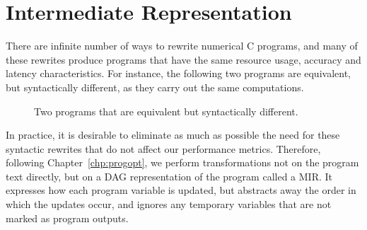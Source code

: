 \section{Intermediate Representation}
\label{sec:intermediate}


There are infinite number of ways to rewrite numerical C programs, and many of
these rewrites produce programs that have the same resource usage, accuracy
and latency characteristics.  For instance, the following two programs
are equivalent, but syntactically different, as they carry out the same
computations.
\begin{figure}[ht]
    \centering
     \qquad \qquad
    \caption{Two programs that are equivalent but syntactically different.}
    \label{fig:equiv_progs}
\end{figure}

In practice, it is desirable to eliminate as much as possible the need
for these syntactic rewrites that do not affect our performance metrics.
Therefore, following Chapter~\ref{chp:progopt}, we perform transformations not
on the program text directly, but on a DAG representation of the program called
a MIR\@.  It expresses how each program variable is updated, but abstracts away
the order in which the updates occur, and ignores any temporary variables that
are not marked as program outputs.

